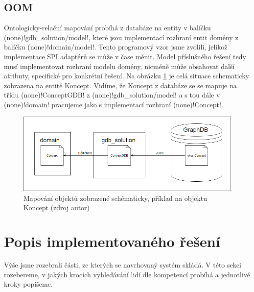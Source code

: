 \subsection{OOM}
Ontologicky-relační mapování probíhá z databáze na entity v balíčku \ctulst(none)!gdb_solution/model!, které jsou implementací rozhraní entit domény z balíčku \ctulst(none)!domain/model!. Tento programový vzor jsme zvolili, jelikož implementace SPI adaptérů se může v čase měnit. Model příslušného řešení tedy musí implementovat rozhraní modelu domény, nicméně může obsahovat další atributy, specifické pro konkrétní řešení. Na obrázku \ref{fig:concept} je celá situace schematicky zobrazena na entitě Koncept. Vidíme, že Koncept z databáze se se mapuje na třídu \ctulst(none)!ConceptGDB! z \ctulst(none)!gdb_solution/model! a s tou dále v \ctulst(none)!domain! pracujeme jako s implementací rozhraní \ctulst(none)!Concept!.
\begin{figure}[htbp!]
	\includegraphics[width=\linewidth]{img/concept.png}
	\caption{Mapování objektů zobrazené schématicky, příklad na objektu Koncept (zdroj autor)}
	\label{fig:concept}
\end{figure}


\section{Popis implementovaného řešení}
Výše jsme rozebrali části, ze kterých se navrhovaný systém skládá. V této sekci rozebereme, v jakých krocích vyhledávání lidí dle kompetencí probíhá a jednotlivé kroky popíšeme.\par
